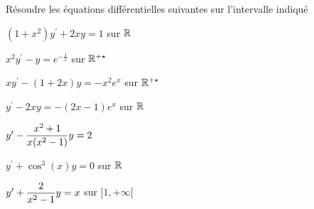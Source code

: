 \documentclass[a4paper, 11pt,reqno]{article}
\begin{document}
\begin{exercice}  \;
R\'esoudre les \'equations diff\'erentielles suivantes sur l'intervalle indiqu\'e
\begin{enumerate}
\begin{minipage}[c]{0.45\linewidth}
\item $(1+x^2)y^{\prime}+2xy=1$ sur $\mathbb{R}$
\item $x^2y^{\prime}-y=e^{-\frac{1}{x}}$ sur $\mathbb{R}^{+\star}$
\item $xy^{\prime}-(1+2x)y=-x^2e^x$ sur $\mathbb{R}^{+\star}$
\item $y^{\prime}-2xy=-(2x-1)e^x$ sur $\mathbb{R}$
\end{minipage}
\begin{minipage}[c]{0.45\linewidth}
\item $y^{\prime}-\displaystyle\frac{x^2+1}{x(x^2-1)}y=2$
\item $y^{\prime}+\cos^3{(x)} y=0$ sur $\mathbb{R}$
\item $y^{\prime}+\displaystyle\frac{2}{x^2-1}y=x$ sur $\rbrack 1,+\infty\lbrack$
\end{minipage}
\end{enumerate}
\end{exercice}
\end{document}
